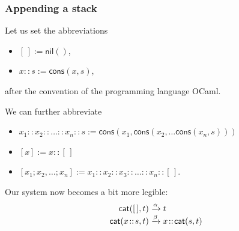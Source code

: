 \documentclass[compress,dvipdfmx]{beamer}
\newcommand{\OCaml}{\textsf{OCaml}\xspace}
\newcommand\fun[1]{\textsf{#1}}
\newcommand\el{[\,]}
\newcommand\cons[2]{{#1}\!::\!{#2}}
\begin{document}
\begin{frame}
  \frametitle{Appending a stack}

  Let us set the abbreviations
  \begin{itemize}

    \item \(\el := \fun{nil}()\),

    \item \(\cons{x}{s} := \fun{cons}(x,s)\),

  \end{itemize}
  after the convention of the programming language \OCaml.

  \bigskip

  We can further abbreviate
  \begin{itemize}

    \item \(\cons{x_1}{\cons{x_2}{\cons{\dots}{\cons{x_n}{s}}}} :=
      \fun{cons}(x_1, \fun{cons}(x_2, \dots \fun{cons}(x_n,s)))\)

    \item \([x] := \cons{x}{\el}\)

    \item \([x_1; x_2, \dots; x_n] :=
          \cons{x_1}{\cons{x_2}{\cons{x_3}{\cons{\ldots}{\cons{x_n}{\el}}}}}\).

  \end{itemize}

  Our system now becomes a bit more legible:
  \begin{align*}
    \fun{cat}(        \el,t) &\xrightarrow{\alpha} t\\
    \fun{cat}(\cons{x}{s},t) &\xrightarrow{\smash{\beta}}
    \cons{x}{\fun{cat}(s,t)}
  \end{align*}

\end{frame}
\end{document}
